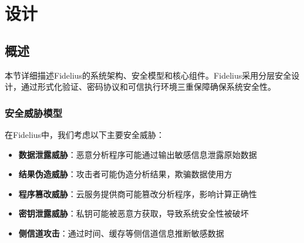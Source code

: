 \section{设计}\label{sec:design}

\subsection{概述}
本节详细描述Fidelius的系统架构、安全模型和核心组件。Fidelius采用分层安全设计，通过形式化验证、密码协议和可信执行环境三重保障确保系统安全性。


\subsubsection{安全威胁模型}
在Fidelius中，我们考虑以下主要安全威胁：
\begin{itemize}
    \item \textbf{数据泄露威胁}：恶意分析程序可能通过输出敏感信息泄露原始数据
    \item \textbf{结果伪造威胁}：攻击者可能伪造分析结果，欺骗数据使用方
    \item \textbf{程序篡改威胁}：云服务提供商可能篡改分析程序，影响计算正确性
    \item \textbf{密钥泄露威胁}：私钥可能被恶意方获取，导致系统安全性被破坏
    \item \textbf{侧信道攻击}：通过时间、缓存等侧信道信息推断敏感数据
\end{itemize}

